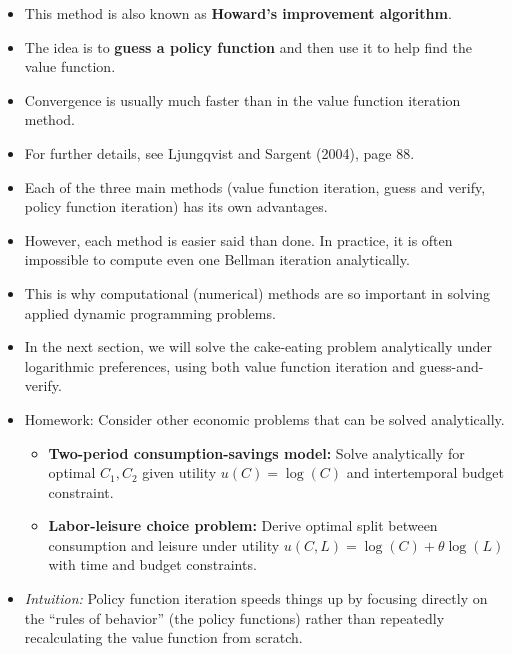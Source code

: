 \documentclass[12pt]{article}
\begin{document}
\begin{itemize}
    \item This method is also known as \textbf{Howard's improvement algorithm}.

    \item The idea is to \textbf{guess a policy function} and then use it to help find the value function.

    \item Convergence is usually much faster than in the value function iteration method.

    \item For further details, see Ljungqvist and Sargent (2004), page 88.

    \item Each of the three main methods (value function iteration, guess and verify, policy function iteration) has its own advantages.

    \item However, each method is easier said than done. In practice, it is often impossible to compute even one Bellman iteration analytically.

    \item This is why computational (numerical) methods are so important in solving applied dynamic programming problems.

    \item In the next section, we will solve the cake-eating problem analytically under logarithmic preferences, using both value function iteration and guess-and-verify.

    \item Homework: Consider other economic problems that can be solved analytically.\begin{itemize}
    \item \textbf{Two-period consumption-savings model:} Solve analytically for optimal \( C_1, C_2 \) given utility \( u(C) = \log(C) \) and intertemporal budget constraint.  

    \item \textbf{Labor-leisure choice problem:} Derive optimal split between consumption and leisure under utility \( u(C,L) = \log(C) + \theta \log(L) \) with time and budget constraints.  
\end{itemize}


    \item \textit{Intuition:} Policy function iteration speeds things up by focusing directly on the “rules of behavior” (the policy functions) rather than repeatedly recalculating the value function from scratch.
\end{itemize}
\end{document}
